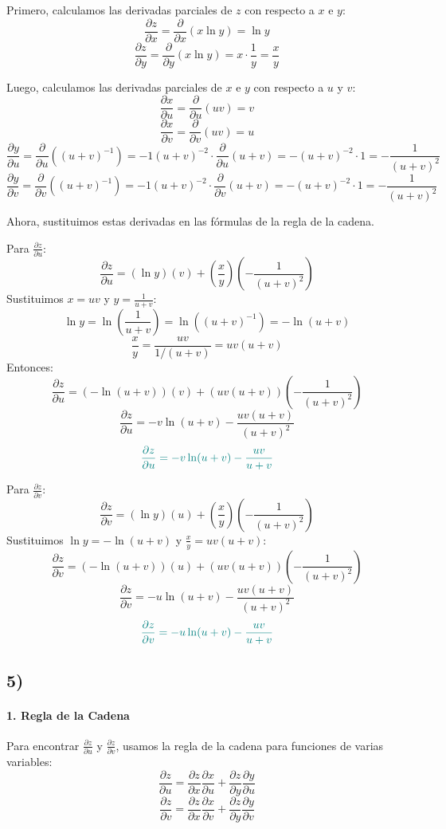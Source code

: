 \documentclass{article}
\begin{document}
Primero, calculamos las derivadas parciales de $z$ con respecto a $x$ e $y$:
\[
\frac{\partial z}{\partial x} = \frac{\partial}{\partial x}(x \ln y) = \ln y
\]
\[
\frac{\partial z}{\partial y} = \frac{\partial}{\partial y}(x \ln y) = x \cdot \frac{1}{y} = \frac{x}{y}
\]

Luego, calculamos las derivadas parciales de $x$ e $y$ con respecto a $u$ y $v$:
\[
\frac{\partial x}{\partial u} = \frac{\partial}{\partial u}(uv) = v
\]
\[
\frac{\partial x}{\partial v} = \frac{\partial}{\partial v}(uv) = u
\]
\[
\frac{\partial y}{\partial u} = \frac{\partial}{\partial u}((u+v)^{-1}) = -1(u+v)^{-2} \cdot \frac{\partial}{\partial u}(u+v) = -(u+v)^{-2} \cdot 1 = -\frac{1}{(u+v)^2}
\]
\[
\frac{\partial y}{\partial v} = \frac{\partial}{\partial v}((u+v)^{-1}) = -1(u+v)^{-2} \cdot \frac{\partial}{\partial v}(u+v) = -(u+v)^{-2} \cdot 1 = -\frac{1}{(u+v)^2}
\]

Ahora, sustituimos estas derivadas en las fórmulas de la regla de la cadena.

Para $\frac{\partial z}{\partial u}$:
\[
\frac{\partial z}{\partial u} = (\ln y)(v) + \left(\frac{x}{y}\right)\left(-\frac{1}{(u+v)^2}\right)
\]
Sustituimos $x = uv$ y $y = \frac{1}{u+v}$:
\[
\ln y = \ln\left(\frac{1}{u+v}\right) = \ln((u+v)^{-1}) = -\ln(u+v)
\]
\[
\frac{x}{y} = \frac{uv}{1/(u+v)} = uv(u+v)
\]
Entonces:
\[
\frac{\partial z}{\partial u} = (-\ln(u+v))(v) + (uv(u+v))\left(-\frac{1}{(u+v)^2}\right)
\]
\[
\frac{\partial z}{\partial u} = -v \ln(u+v) - \frac{uv(u+v)}{(u+v)^2}
\]
\[ \color{teal}
{\frac{\partial z}{\partial u} = -v \ln(u+v) - \frac{uv}{u+v}}
\]

Para $\frac{\partial z}{\partial v}$:
\[
\frac{\partial z}{\partial v} = (\ln y)(u) + \left(\frac{x}{y}\right)\left(-\frac{1}{(u+v)^2}\right)
\]
Sustituimos $\ln y = -\ln(u+v)$ y $\frac{x}{y} = uv(u+v)$:
\[
\frac{\partial z}{\partial v} = (-\ln(u+v))(u) + (uv(u+v))\left(-\frac{1}{(u+v)^2}\right)
\]
\[
\frac{\partial z}{\partial v} = -u \ln(u+v) - \frac{uv(u+v)}{(u+v)^2}
\]
\[ \color{teal}
{\frac{\partial z}{\partial v} = -u \ln(u+v) - \frac{uv}{u+v}}
\]



\subsection*{5)}

\paragraph{1. Regla de la Cadena}
Para encontrar $\frac{\partial z}{\partial u}$ y $\frac{\partial z}{\partial v}$, usamos la regla de la cadena para funciones de varias variables:
\[
\frac{\partial z}{\partial u} = \frac{\partial z}{\partial x} \frac{\partial x}{\partial u} + \frac{\partial z}{\partial y} \frac{\partial y}{\partial u}
\]
\[
\frac{\partial z}{\partial v} = \frac{\partial z}{\partial x} \frac{\partial x}{\partial v} + \frac{\partial z}{\partial y} \frac{\partial y}{\partial v}
\]
\end{document}
